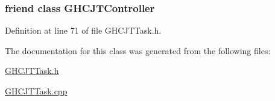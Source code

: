 \subsubsection[{\texorpdfstring{G\+H\+C\+J\+T\+Controller}{GHCJTController}}]{\setlength{\rightskip}{0pt plus 5cm}friend class {\bf G\+H\+C\+J\+T\+Controller}\hspace{0.3cm}{\ttfamily [friend]}}\hypertarget{classgocra_1_1GHCJTTask_ad38e451271fa3f064d99a850190a56e7}{}\label{classgocra_1_1GHCJTTask_ad38e451271fa3f064d99a850190a56e7}


Definition at line 71 of file G\+H\+C\+J\+T\+Task.\+h.



The documentation for this class was generated from the following files\+:\begin{DoxyCompactItemize}
\item 
\hyperlink{GHCJTTask_8h}{G\+H\+C\+J\+T\+Task.\+h}\item 
\hyperlink{GHCJTTask_8cpp}{G\+H\+C\+J\+T\+Task.\+cpp}\end{DoxyCompactItemize}
